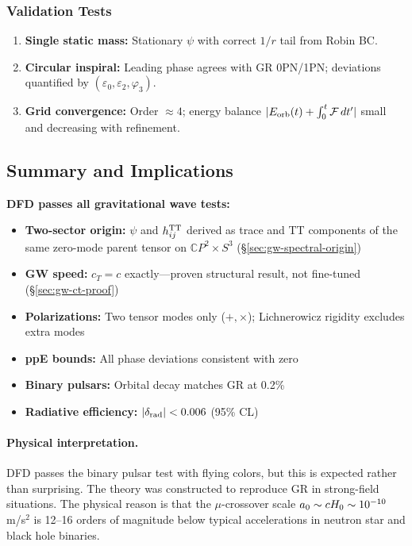 \subsubsection{Validation Tests}

\begin{enumerate}
\item \textbf{Single static mass:} Stationary $\psi$ with correct $1/r$ tail from Robin BC.
\item \textbf{Circular inspiral:} Leading phase agrees with GR 0PN/1PN; deviations 
      quantified by $(\varepsilon_0, \varepsilon_2, \varphi_3)$.
\item \textbf{Grid convergence:} Order $\approx 4$; energy balance 
      $|E_{\rm orb}(t) + \int_0^t \mathcal{F}\,dt'|$ small and decreasing with refinement.
\end{enumerate}

\subsection{Summary and Implications}\label{sec:gw-summary}

\begin{tcolorbox}[colback=blue!5!white, colframe=blue!50!black, title=Summary: Gravitational Wave Tests]
\textbf{DFD passes all gravitational wave tests:}
\begin{itemize}
\item \textbf{Two-sector origin:} $\psi$ and $h_{ij}^{\rm TT}$ derived as trace and TT components of the same zero-mode parent tensor on $\mathbb{C}P^2\times S^3$ (\S\ref{sec:gw-spectral-origin})
\item \textbf{GW speed:} $c_T = c$ exactly---proven structural result, not fine-tuned (\S\ref{sec:gw-ct-proof})
\item \textbf{Polarizations:} Two tensor modes only ($+, \times$); Lichnerowicz rigidity excludes extra modes
\item \textbf{ppE bounds:} All phase deviations consistent with zero
\item \textbf{Binary pulsars:} Orbital decay matches GR at 0.2\%
\item \textbf{Radiative efficiency:} $|\delta_{\rm rad}| < 0.006$ (95\% CL)
\end{itemize}
\end{tcolorbox}

\paragraph{Physical interpretation.}
DFD passes the binary pulsar test with flying colors, but this is expected rather than surprising. The theory was constructed to reproduce GR in strong-field situations. The physical reason is that the $\mu$-crossover scale $a_0 \sim cH_0 \sim 10^{-10}$ m/s$^2$ is 12--16 orders of magnitude below typical accelerations in neutron star and black hole binaries.

